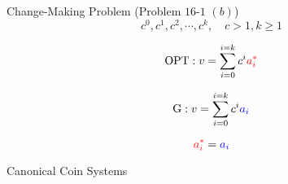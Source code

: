 \begin{frame}{}
  \begin{exampleblock}{Change-Making Problem (Problem $16$-$1$ $(b)$)}
    \[
      c^0, c^1, c^2, \cdots, c^k, \quad c > 1, k \ge 1
    \]
  \end{exampleblock}

  \pause
  \[
    \text{OPT}: v = \sum_{i=0}^{i=k} c^{i} \textcolor{red}{a^{\ast}_{i}}
  \]

  \pause
  \vspace{0.30cm}
  \[
    \text{G}: v = \sum_{i=0}^{i=k} c^{i} \textcolor{blue}{a_{i}}
  \]

  \pause
  \vspace{0.50cm}
  \[
    \textcolor{red}{a^{\ast}_{i}} = \textcolor{blue}{a_{i}}
  \]
\end{frame}

\begin{frame}{}
  \centerline{\Large Canonical Coin Systems}

  \vspace{0.30cm}
\end{frame}
